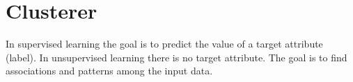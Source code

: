 \section{Clusterer}

In supervised learning the goal is to predict the value of a target
attribute (label). In unsupervised learning there is no target
attribute. The goal is to find associations and patterns among the
input data.

